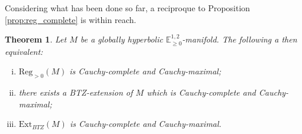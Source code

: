 \documentclass[a4paper,12pt]{article}
\newcommand{\mass}[1]{{\mathbb E}^{1,2}_{#1}}
\def\Reg{\mathrm{Reg}}
\def\BTZext{\mathrm{Ext}_{BTZ}}
\def\reg{\Reg}
\newtheorem{theo}{Theorem}    %
\begin{document}
                  

                 Considering what has been done so far, a reciproque to Proposition \ref{prop:reg_complete} is within reach. 
                 
				\begin{theo} \label{theo:BTZ_Cauchy-completness}
				Let $M$ be a globally hyperbolic $\mass{\geq0}$-manifold. The following a then equivalent:			
				\begin{enumerate}[(i)]
				\item $\reg_{>0}(M)$ is Cauchy-complete and Cauchy-maximal;
				\item there exists a BTZ-extension of $M$ which is Cau\-chy-com\-plete and Cau\-chy-maxi\-mal;
				\item $\BTZext(M)$ is Cauchy-complete and Cauchy-maxi\-mal.
				\end{enumerate}
				\end{theo}
				
\end{document}
